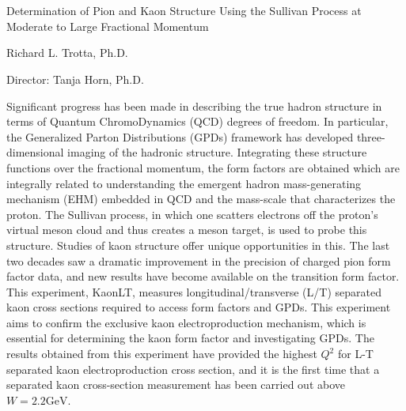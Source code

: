\chapter[Abstract]{\label{Abstract}}

\begin{center}
  {\large Determination of Pion and Kaon Structure Using the Sullivan Process at Moderate to Large Fractional Momentum\par}
  \vspace{0.5cm}
  {\large Richard L. Trotta, Ph.D.\par}
  {Director: Tanja Horn, Ph.D.\par}
\end{center}

\vspace{0.5cm}

Significant progress has been made in describing the true hadron structure in terms of Quantum ChromoDynamics (QCD) degrees of freedom. In particular, the Generalized Parton Distributions (GPDs) framework has developed three-dimensional imaging of the hadronic structure. Integrating these structure functions over the fractional momentum, the form factors are obtained which are integrally related to understanding the emergent hadron mass-generating mechanism (EHM) embedded in QCD and the mass-scale that characterizes the proton. The Sullivan process, in which one scatters electrons off the proton’s virtual meson cloud and thus creates a meson target, is used to probe this structure. Studies of kaon structure offer unique opportunities in this. The last two decades saw a dramatic improvement in the precision of charged pion form factor data, and new results have become available on the transition form factor. This experiment, KaonLT, measures longitudinal/transverse (L/T) separated kaon cross sections required to access form factors and GPDs. This experiment aims to confirm the exclusive kaon electroproduction mechanism, which is essential for determining the kaon form factor and investigating GPDs. The results obtained from this experiment have provided the highest $Q^2$ for L-T separated kaon electroproduction cross section, and it is the first time that a separated kaon cross-section measurement has been carried out above $W=2.2 \mathrm{GeV}$.

\thispagestyle{empty} %
